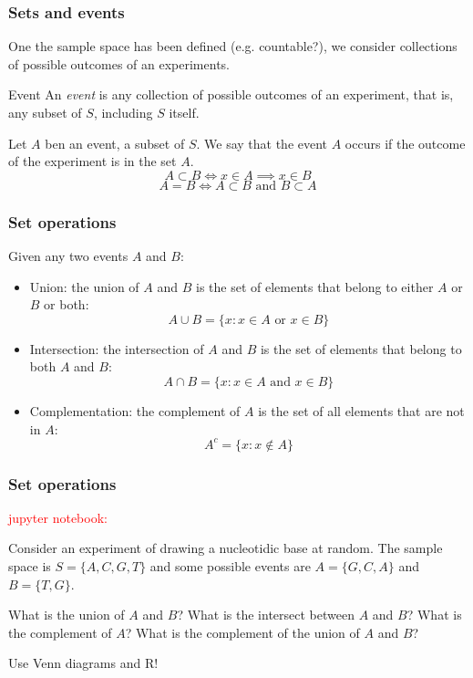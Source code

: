 \documentclass{beamer}
\begin{document}
\begin{frame}
	\frametitle{Sets and events}

	One the sample space has been defined (e.g. countable?), we consider collections of possible outcomes of an experiments.
	\begin{block}{Event}
		An \textit{event} is any collection of possible outcomes of an experiment, that is, any subset of $S$, including $S$ itself.
	\end{block}

	Let $A$ ben an event, a subset of $S$. We say that the event $A$ occurs if the outcome of the experiment is in the set $A$.
	\begin{equation*}
		A \subset B \iff x \in A \implies x \in B
	\end{equation*}
	\begin{equation*}
		A = B \iff A \subset B \text{ and } B \subset A
	\end{equation*}	

\end{frame}

\begin{frame}
	\frametitle{Set operations}

	Given any two events $A$ and $B$:
	\begin{itemize}
		\item Union: the union of $A$ and $B$ is the set of elements that belong to either $A$ or $B$ or both:
		\begin{equation*}
			A \cup B = \{x: x \in A \text{ or } x \in B\}
		\end{equation*}
		\pause
		\item Intersection: the intersection of $A$ and $B$ is the set of elements that belong to both $A$ and $B$:
		\begin{equation*}
			A \cap B = \{x: x \in A \text{ and } x \in B\}
		\end{equation*}
		\pause
		\item Complementation: the complement of $A$ is the set of all elements that are not in $A$:
		\begin{equation*}
			A^c = \{x:x \notin A\}
		\end{equation*}
	\end{itemize}

\end{frame}

\begin{frame}
        \frametitle{Set operations}

	\textcolor{red}{jupyter notebook:}

	Consider an experiment of drawing a nucleotidic base at random. The sample space is $S=\{A,C,G,T\}$ and some possible 
	events are $A=\{G,C,A\}$ and $B=\{T,G\}$.

	What is the union of $A$ and $B$? What is the intersect between $A$ and $B$? What is the complement of $A$? 
	What is the complement of the union of $A$ and $B$?

	Use Venn diagrams and R!


\end{frame}
\end{document}
